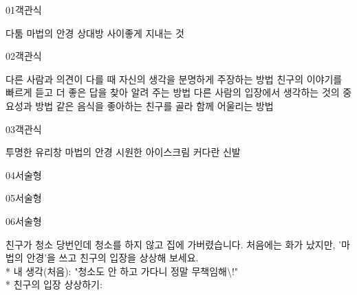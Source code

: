 \documentclass[fs12,seriesSau]{korfarm-base}
\begin{document}

\begin{kfQBlock}{01}{객관식}
\begin{kfChoices}
\kfChoice 다툼
\kfChoice 마법의 안경
\kfChoice 상대방
\kfChoice 사이좋게 지내는 것
\end{kfChoices}
\end{kfQBlock}
\begin{kfQBlock}{02}{객관식}
\begin{kfChoices}
\kfChoice 다른 사람과 의견이 다를 때 자신의 생각을 분명하게 주장하는 방법
\kfChoice 친구의 이야기를 빠르게 듣고 더 좋은 답을 찾아 알려 주는 방법
\kfChoice 다른 사람의 입장에서 생각하는 것의 중요성과 방법
\kfChoice 같은 음식을 좋아하는 친구를 골라 함께 어울리는 방법
\end{kfChoices}
\end{kfQBlock}
\begin{kfQBlock}{03}{객관식}
\begin{kfChoices}
\kfChoice 투명한 유리창
\kfChoice 마법의 안경
\kfChoice 시원한 아이스크림
\kfChoice 커다란 신발
\end{kfChoices}
\end{kfQBlock}
\begin{kfQBlock}{04}{서술형}
\end{kfQBlock}
\begin{kfQBlock}{05}{서술형}
\end{kfQBlock}
\begin{kfQBlock}{06}{서술형}
\begin{kfEvidence}친구가 청소 당번인데 청소를 하지 않고 집에 가버렸습니다. 처음에는 화가 났지만, '마법의 안경'을 쓰고 친구의 입장을 상상해 보세요. \\\relax
* 내 생각(처음): "청소도 안 하고 가다니 정말 무책임해\textbackslash{}!" \\\relax
* 친구의 입장 상상하기:\end{kfEvidence}
\end{kfQBlock}
\end{document}
